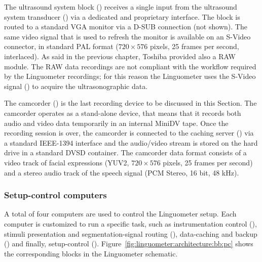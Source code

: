 The ultrasound system block () receives a single input from the
ultrasound system transducer () via a dedicated and proprietary
interface. The  block is routed to a standard VGA monitor via a D-SUB
connection (not shown). 
The same video signal that is used to refresh the monitor is available on
an S-Video connector, in standard PAL format ($720\times576$ pixels, 25 frames
per second, interlaced).
As said in the previous chapter, Toshiba provided also a RAW module. 
The RAW data recordings are not compliant with the workflow required by the
Linguometer recordings; for this reason the Linguometer uses the S-Video
signal () to acquire the 
ultrasonographic data.

The camcorder () is the last recording device to be discussed in this
Section.
The camcorder operates as a stand-alone device, that means that it records
both audio and video data temporarily in an internal MiniDV tape.
Once the recording session is over, the camcorder is connected to the caching
server () via a standard IEEE-1394 interface and the audio/video
stream is stored on the hard drive in a standard DVSD container.
The camcorder data format consists of a video track of facial expressions (YUV2,
$720\times576$ pixels, 25 frames per second) and a stereo audio track 
of the speech signal (PCM Stereo, 16 bit, 48 kHz).
\subsubsection{Setup-control computers}
A total of four computers are used to control the Linguometer setup.
Each computer is customized to run a specific task, such as instrumentation 
control (), stimuli presentation and segmentation-signal routing 
(), data-caching and backup () and finally, setup-control 
().
Figure~\ref{fig:linguometer:architecture:bb:pc} shows the corresponding blocks
in the Linguometer schematic.


